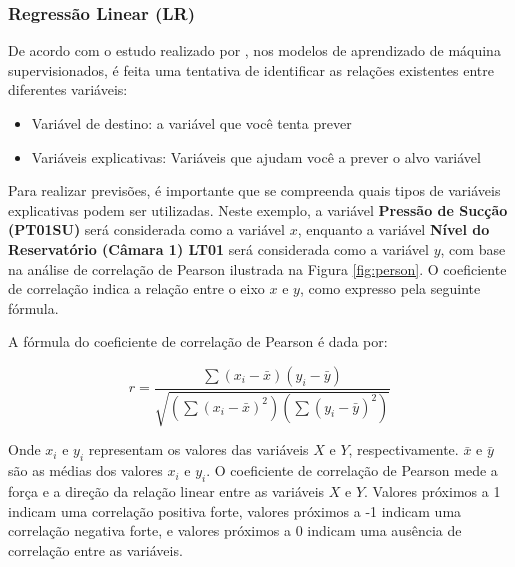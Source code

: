 \subsubsection{Regress\~ao Linear (LR)}

De acordo com o estudo realizado por , nos modelos de aprendizado de máquina supervisionados, é feita uma tentativa de identificar as relações existentes entre diferentes variáveis:


\begin{itemize}
	\item Variável de destino: a variável que você tenta prever
	\item Variáveis explicativas: Variáveis que ajudam você a prever o alvo variável
\end{itemize}

Para realizar previsões, é importante que se compreenda quais tipos de variáveis explicativas podem ser utilizadas. Neste exemplo, a variável \textbf{Pressão de Sucção (PT01SU)} será considerada como a variável $x$, enquanto a variável \textbf{Nível do Reservatório (Câmara 1) LT01} será considerada como a variável $y$, com base na análise de correlação de Pearson ilustrada na Figura \ref{fig:person}. O coeficiente de correlação indica a relação entre o eixo $x$ e $y$, como expresso pela seguinte fórmula.



A fórmula do coeficiente de correlação de Pearson é dada por:

\begin{equation}
	r=\frac{\sum\left(x_i-\bar{x}\right)\left(y_i-\bar{y}\right)}{\sqrt{\left(\sum\left(x_i-\bar{x}\right)^2\right)\left(\sum\left(y_i-\bar{y}\right)^2\right)}}
\end{equation}

Onde $x_i$ e $y_i$ representam os valores das variáveis $X$ e $Y$, respectivamente. $\bar{x}$ e $\bar{y}$ são as médias dos valores $x_i$ e $y_i$. O coeficiente de correlação de Pearson mede a força e a direção da relação linear entre as variáveis $X$ e $Y$. Valores próximos a 1 indicam uma correlação positiva forte, valores próximos a -1 indicam uma correlação negativa forte, e valores próximos a 0 indicam uma ausência de correlação entre as variáveis.

